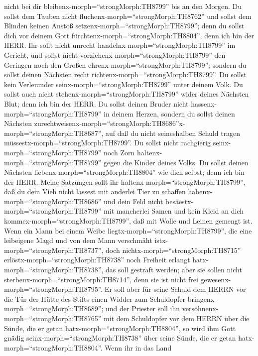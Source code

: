 nicht bei dir bleibenx-morph=``strongMorph:TH8799'' bis an den Morgen.
 Du sollst dem Tauben nicht
fluchenx-morph=``strongMorph:TH8762'' und sollst dem Blinden keinen
Anstoß setzenx-morph=``strongMorph:TH8799''; denn du sollst dich vor
deinem Gott fürchtenx-morph=``strongMorph:TH8804'', denn ich bin der
HERR.  Ihr sollt nicht unrecht
handelnx-morph=``strongMorph:TH8799'' im Gericht, und sollst nicht
vorziehenx-morph=``strongMorph:TH8799'' den Geringen noch den Großen
ehrenx-morph=``strongMorph:TH8799''; sondern du sollst deinen Nächsten
recht richtenx-morph=``strongMorph:TH8799''.  Du sollst
kein Verleumder seinx-morph=``strongMorph:TH8799'' unter deinem Volk. Du
sollst auch nicht stehenx-morph=``strongMorph:TH8799'' wider deines
Nächsten Blut; denn ich bin der HERR.  Du sollst deinen
Bruder nicht hassenx-morph=``strongMorph:TH8799'' in deinem Herzen,
sondern du sollst deinen Nächsten
zurechtweisenx-morph=``strongMorph:TH8686''x-morph=``strongMorph:TH8687'',
auf daß du nicht seineshalben Schuld tragen
müssestx-morph=``strongMorph:TH8799''.  Du sollst nicht
rachgierig seinx-morph=``strongMorph:TH8799'' noch Zorn
haltenx-morph=``strongMorph:TH8799'' gegen die Kinder deines Volks. Du
sollst deinen Nächsten liebenx-morph=``strongMorph:TH8804'' wie dich
selbst; denn ich bin der HERR.  Meine Satzungen sollt ihr
haltenx-morph=``strongMorph:TH8799'', daß du dein Vieh nicht lassest mit
anderlei Tier zu schaffen habenx-morph=``strongMorph:TH8686'' und dein
Feld nicht besäestx-morph=``strongMorph:TH8799'' mit mancherlei Samen
und kein Kleid an dich kommex-morph=``strongMorph:TH8799'', daß mit
Wolle und Leinen gemengt ist.  Wenn ein Mann bei einem
Weibe liegtx-morph=``strongMorph:TH8799'', die eine leibeigene Magd und
von dem Mann verschmäht istx-morph=``strongMorph:TH8737'', doch
nichtx-morph=``strongMorph:TH8715'' erlöstx-morph=``strongMorph:TH8738''
noch Freiheit erlangt hatx-morph=``strongMorph:TH8738'', das soll
gestraft werden; aber sie sollen nicht
sterbenx-morph=``strongMorph:TH8714'', denn sie ist nicht frei
gewesenx-morph=``strongMorph:TH8795''.  Er soll aber für
seine Schuld dem HERRN vor die Tür der Hütte des Stifts einen Widder zum
Schuldopfer bringenx-morph=``strongMorph:TH8689'';  und der
Priester soll ihn versöhnenx-morph=``strongMorph:TH8765'' mit dem
Schuldopfer vor dem HERRN über die Sünde, die er getan
hatx-morph=``strongMorph:TH8804'', so wird ihm Gott gnädig
seinx-morph=``strongMorph:TH8738'' über seine Sünde, die er getan
hatx-morph=``strongMorph:TH8804''.  Wenn ihr in das Land
